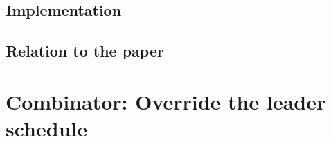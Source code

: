 \subsection{Implementation}

\subsection{Relation to the paper}
\label{praos-paper}

\cite{cryptoeprint:2018:378}

\section{Combinator: Override the leader schedule}
\label{consensus:override-leader-schedule}
